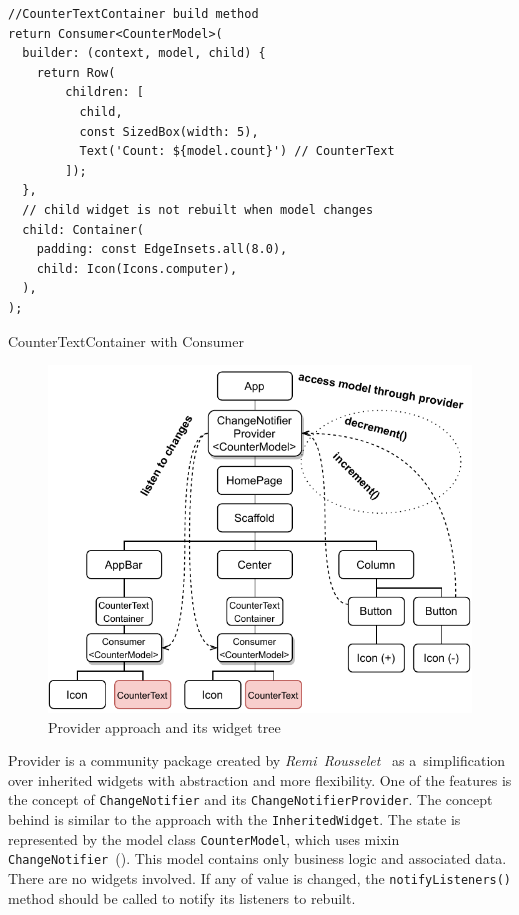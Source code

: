 \begin{listing}[ht]
\begin{verbatim}
//CounterTextContainer build method
return Consumer<CounterModel>(
  builder: (context, model, child) {
    return Row(
        children: [
          child,
          const SizedBox(width: 5),
          Text('Count: ${model.count}') // CounterText
        ]);
  },
  // child widget is not rebuilt when model changes
  child: Container(
    padding: const EdgeInsets.all(8.0),
    child: Icon(Icons.computer),
  ),
);
\end{verbatim}
\caption{CounterTextContainer with Consumer}
\label{listing:counter-provider-consumer}
\end{listing}

\begin{figure}[ht]
    \centering
    \includegraphics[width=0.75\linewidth]{img/flutter/counter-provider.pdf}
    \caption{Provider approach and its widget tree}
    \label{fig:counter-app-provider}
\end{figure}

Provider is a community package created by \textit{Remi~Rousselet}~\cite{package-provider} as a~simplification over inherited widgets with abstraction and more flexibility. One of the features is the concept of \verb|ChangeNotifier| and its \verb|ChangeNotifierProvider|. The concept behind is similar to the approach with the \verb|InheritedWidget|. The state is represented by the model class \verb|CounterModel|, which uses mixin \verb|ChangeNotifier|~(). This model contains only business logic and associated data. There are no widgets involved. If any of value is changed, the \verb|notifyListeners()| method should be called to notify its listeners to rebuilt.

